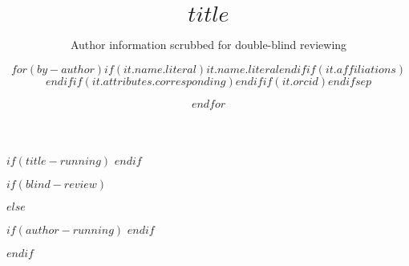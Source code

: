 \title{$title$}

$if(title-running)$
$endif$

$if(blind-review)$
\author{Author information scrubbed for double-blind reviewing}
$else$
\author{$for(by-author)$$if(it.name.literal)$$it.name.literal$$endif$$if(it.affiliations)$$endif$$if(it.attributes.corresponding)$\corr$endif$$if(it.orcid)$$endif$$sep$ \and $endfor$}

$if(author-running)$
$endif$


$endif$